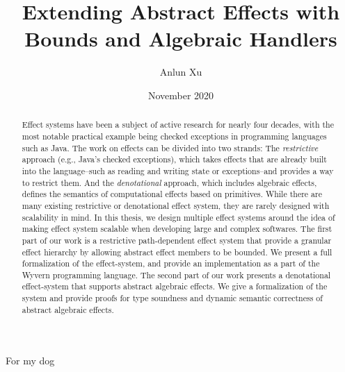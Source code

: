 \documentclass[12pt]{cmuthesis}
\begin{document}
 
\frontmatter

\pagestyle{empty}

\title{ %
{\bf Extending Abstract Effects with Bounds and Algebraic Handlers}}
\author{Anlun Xu}
\date{November 2020}
\trnumber{}

\committee{
\ 
}

\support{}
\disclaimer{}



\maketitle

\begin{dedication}
For my dog
\end{dedication}

\pagestyle{plain} %


\begin{abstract}
Effect systems have been a subject of active research for nearly four decades, with the most notable practical example being checked exceptions in programming languages such as Java.  The work on effects can be divided into two strands: The \textit{restrictive} approach (e.g., Java's checked exceptions), which takes effects that are already built into the language--such as reading and writing state or exceptions--and provides a way to restrict them. And the \textit{denotational} approach, which includes algebraic effects, defines the semantics of computational effects based on primitives. While there are many existing restrictive or denotational effect system, they are rarely designed with scalability in mind. In this thesis, we design multiple effect systems around the idea of making effect system scalable when developing large and complex softwares. The first part of our work is a restrictive path-dependent effect system that provide a granular effect hierarchy by allowing abstract effect members to be bounded. We present a full formalization of the effect-system, and provide an implementation as a part of the Wyvern programming language. The second part of our work presents a denotational effect-system that supports abstract algebraic effects. We give a formalization of the system and provide proofs for type soundness and dynamic semantic correctness of abstract algebraic effects. 
\end{abstract}
\begin{acknowledgments}
\end{acknowledgments}
\end{document}
